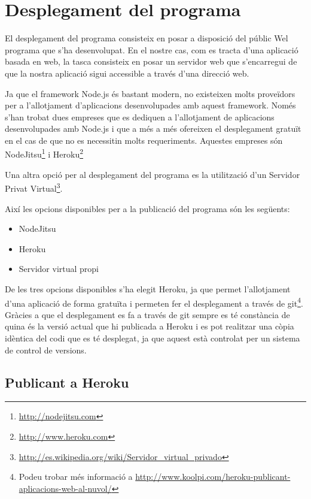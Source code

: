 \chapter{Desplegament del programa}
\label{chap:desplegament}

El desplegament del programa consisteix en posar a disposició del públic Wel programa que s'ha desenvolupat. En el nostre cas, com es tracta d'una aplicació basada en web, la tasca consisteix en posar un servidor web que s'encarregui de que la nostra aplicació sigui accessible a través d'una direcció web. 

Ja que el framework Node.js és bastant modern, no existeixen molts proveïdors per a l'allotjament d'aplicacions desenvolupades amb aquest framework. Només s'han trobat dues empreses que es dediquen a l'allotjament de aplicacions desenvolupades amb Node.js i que a més a més ofereixen el desplegament gratuït en el cas de que no es necessitin molts requeriments. Aquestes empreses són NodeJitsu\footnote{\url{http://nodejitsu.com}} i Heroku\footnote{\url{http://www.heroku.com}}

Una altra opció per al desplegament del programa es la utilització d'un Servidor Privat Virtual\footnote{\url{http://es.wikipedia.org/wiki/Servidor_virtual_privado}}. 

Així les opcions disponibles per a la publicació del programa són les següents: 

\begin{itemize}
\item{NodeJitsu}
\item{Heroku}
\item{Servidor virtual propi}
\end{itemize}


De les tres opcions disponibles s'ha elegit Heroku, ja que permet l'allotjament d'una aplicació de forma gratuïta i permeten fer el desplegament a través de git\footnote{Podeu trobar més informació a \url{http://www.koolpi.com/heroku-publicant-aplicacions-web-al-nuvol/} }. Gràcies a que el desplegament es fa a través de git sempre es té constància de quina és la versió actual que hi publicada a Heroku i es pot realitzar una còpia idèntica del codi que es té desplegat, ja que aquest està controlat per un sistema de control de versions.

\section{Publicant a Heroku}


